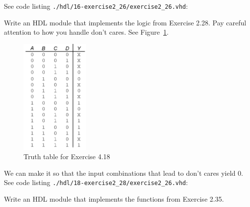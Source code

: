 \documentclass[12pt]{article}
\newenvironment{ex}[2][Exercise]{\begin{trivlist}
		\item[\hskip \labelsep {\bfseries #1}\hskip \labelsep {\bfseries #2.}]}{\end{trivlist}}
\newenvironment{sol}[1][Solution]{\begin{trivlist}
		\item[\hskip \labelsep {\bfseries #1:}]}{\end{trivlist}}
\begin{document}
\begin{sol}
	See code listing \texttt{./hdl/16-exercise2\_26/exercise2\_26.vhd}:
	
\end{sol}

\begin{ex}{4.18}
	Write an HDL module that implements the logic from Exercise 2.28. Pay careful attention
	to how you handle don't cares. See Figure~\ref{04-18-truthtable}.
	\begin{figure}
		\centering
		\includegraphics[width=0.3\textwidth]{04-18-truthtable}
		\caption{Truth table for Exercise 4.18}
		\label{04-18-truthtable}
	\end{figure}
\end{ex}

\begin{sol}
	We can make it so that the input combinations that lead to don't cares yield 0.
	See code listing \texttt{./hdl/18-exercise2\_28/exercise2\_26.vhd}:
	
\end{sol}

\begin{ex}{4.19}
	Write an HDL module that implements the functions from Exercise 2.35.
\end{ex}
\end{document}
